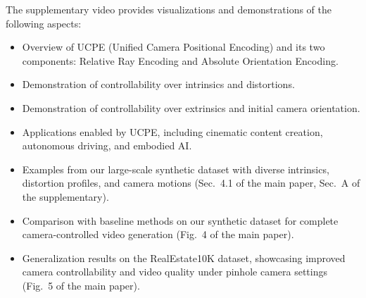 The supplementary video provides visualizations and demonstrations of the following aspects:
\begin{itemize}
    \item Overview of UCPE (Unified Camera Positional Encoding) and its two components: Relative Ray Encoding and Absolute Orientation Encoding.
    \item Demonstration of controllability over intrinsics and distortions.
    \item Demonstration of controllability over extrinsics and initial camera orientation.
    \item Applications enabled by UCPE, including cinematic content creation, autonomous driving, and embodied AI.
    \item Examples from our large-scale synthetic dataset with diverse intrinsics, distortion profiles, and camera motions (Sec.~4.1 of the main paper, Sec.~A of the supplementary).
    \item Comparison with baseline methods on our synthetic dataset for complete camera-controlled video generation (Fig.~4 of the main paper).
    \item Generalization results on the RealEstate10K dataset, showcasing improved camera controllability and video quality under pinhole camera settings (Fig.~5 of the main paper).
\end{itemize}





